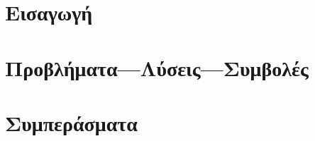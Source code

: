 








\part{Εισαγωγή}
  

\part{Προβλήματα---Λύσεις---Συμβολές}

\part{Συμπεράσματα}


\printbibliography[heading=bibintoc,title={\textgreek{Αναφορές}}]


